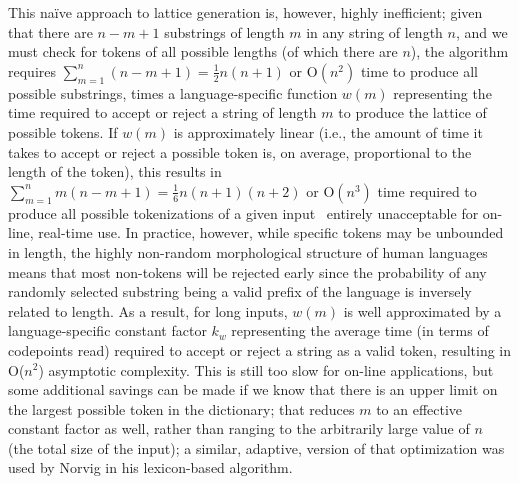 This naïve approach to lattice generation is, however, highly inefficient; given that there are $n-m+1$ substrings of length $m$ in any string of length $n$, and we must check for tokens of all possible lengths (of which there are $n$), the algorithm requires $\sum_{m=1}^{n}(n-m+1)=\frac{1}{2}n(n+1)$ or O$(n^{2})$ time to produce all possible substrings, times a language-specific function $w(m)$ representing the time required to accept or reject a string of length $m$ to produce the lattice of possible tokens. If $w(m)$ is approximately linear (i.e., the amount of time it takes to accept or reject a possible token is, on average, proportional to the length of the token), this results in $\sum_{m=1}^{n}m(n-m+1)=\frac{1}{6}n(n+1)(n+2)$ or O$(n^{3})$ time required to produce all possible tokenizations of a given input\textemdash~ entirely unacceptable for on-line, real-time use.
In practice, however, while specific tokens may be unbounded in length, the highly non-random morphological structure of human languages means that most non-tokens will be rejected early since the probability of any randomly selected substring being a valid prefix of the language is inversely related to length. As a result, for long inputs, $w(m)$ is well approximated by a language-specific constant factor $k_w$ representing the average time (in terms of codepoints read) required to accept or reject a string as a valid token, resulting in O($n^{2}$) asymptotic complexity. This is still too slow for on-line applications, but some additional savings can be made if we know that there is an upper limit on the largest possible token in the dictionary; that reduces $m$ to an effective constant factor as well, rather than ranging to the arbitrarily large value of $n$ (the total size of the input); a similar, adaptive, version of that optimization was used by Norvig in his lexicon-based algorithm\cite{norvig14}.

